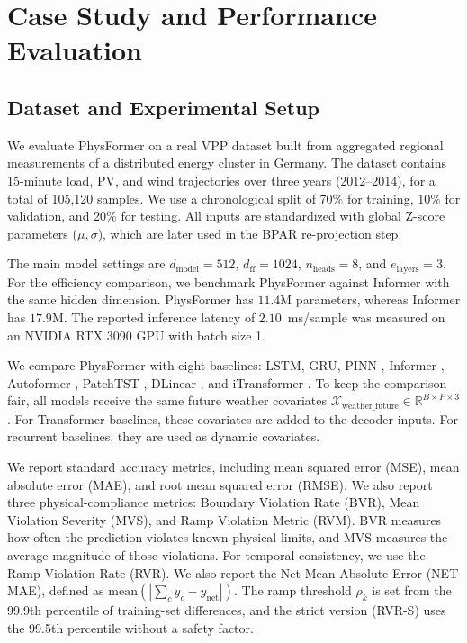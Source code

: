 \section{Case Study and Performance Evaluation}
\label{sec:experiments}

\subsection{Dataset and Experimental Setup}
\label{subsec:exp_setup}

We evaluate PhysFormer on a real VPP dataset built from aggregated regional measurements of a distributed energy cluster in Germany. The dataset contains 15-minute load, PV, and wind trajectories over three years (2012--2014), for a total of 105,120 samples. We use a chronological split of 70\% for training, 10\% for validation, and 20\% for testing. All inputs are standardized with global Z-score parameters ($\mu, \sigma$), which are later used in the BPAR re-projection step.

The main model settings are $d_{\text{model}} = 512$, $d_{\text{ff}} = 1024$, $n_{\text{heads}} = 8$, and $e_{\text{layers}} = 3$. For the efficiency comparison, we benchmark PhysFormer against Informer with the same hidden dimension. PhysFormer has $11.4$M parameters, whereas Informer has $17.9$M. The reported inference latency of $2.10$~ms/sample was measured on an NVIDIA RTX 3090 GPU with batch size 1.

We compare PhysFormer with eight baselines: LSTM, GRU, PINN \cite{Raissi2019}, Informer \cite{Zhou2021informer}, Autoformer \cite{Wu2021autoformer}, PatchTST \cite{Nie2023patchtst}, DLinear \cite{Zeng2023}, and iTransformer \cite{Liu2023itransformer}. To keep the comparison fair, all models receive the same future weather covariates $\mathcal{X}_{\text{weather\_future}} \in \mathbb{R}^{B \times P \times 3}$. For Transformer baselines, these covariates are added to the decoder inputs. For recurrent baselines, they are used as dynamic covariates.

We report standard accuracy metrics, including mean squared error (MSE), mean absolute error (MAE), and root mean squared error (RMSE). We also report three physical-compliance metrics: Boundary Violation Rate (BVR), Mean Violation Severity (MVS), and Ramp Violation Metric (RVM). BVR measures how often the prediction violates known physical limits, and MVS measures the average magnitude of those violations. For temporal consistency, we use the Ramp Violation Rate (RVR). We also report the Net Mean Absolute Error (NET MAE), defined as $\text{mean}(|\sum_c \hat{y}_c - y_{\text{net}}|)$. The ramp threshold $\rho_k$ is set from the 99.9th percentile of training-set differences, and the strict version (RVR-S) uses the 99.5th percentile without a safety factor.

